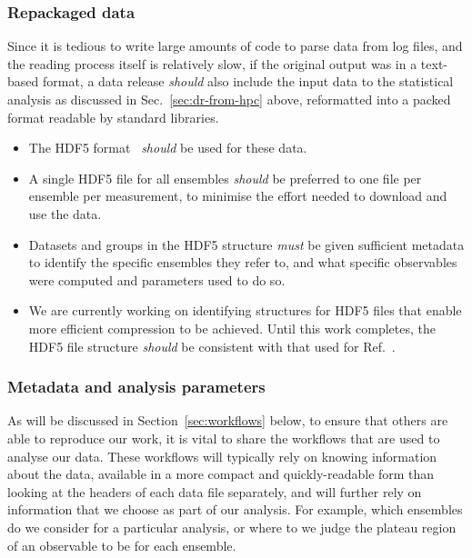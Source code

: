 \documentclass{article}
\newcommand\rfcword[1]{\emph{#1}\xspace}
\newcommand\must{\rfcword{must}}
\newcommand\should{\rfcword{should}}
\begin{document}
\subsubsection{Repackaged data}

Since it is tedious to write large amounts of code to parse data from log files,
and the reading process itself is relatively slow,
if the original output was in a text-based format,
a data release \should also include the input data to the statistical analysis
as discussed in Sec.~\ref{sec:dr-from-hpc} above,
reformatted into a packed format readable by standard libraries.

\begin{itemize}
  \item
        The HDF5 format~\cite{hdf5} \should be used for these data.
  \item
        A single HDF5 file for all ensembles \should be preferred
        to one file per ensemble per measurement,
        to minimise the effort needed to download and use the data.
  \item
        Datasets and groups in the HDF5 structure \must be given
        sufficient metadata to identify the specific ensembles they refer to,
        and what specific observables were computed and parameters used to do so.
  \item
        We are currently working on identifying
        structures for HDF5 files that enable more efficient compression to be achieved.
        Until this work completes,
        the HDF5 file structure \should be consistent with
        that used for Ref.~\cite{bennett_2024_13819562}.
\end{itemize}


\subsubsection{Metadata and analysis parameters}

As will be discussed in Section~\ref{sec:workflows} below,
to ensure that others are able to reproduce our work,
it is vital to share the workflows that are used to analyse our data.
These workflows will typically rely on knowing information about the data,
available in a more compact and quickly-readable form than
looking at the headers of each data file separately,
and will further rely on information that we choose as part of our analysis.
For example,
which ensembles do we consider for a particular analysis,
or where to we judge the plateau region of an observable to be for each ensemble.
\end{document}
